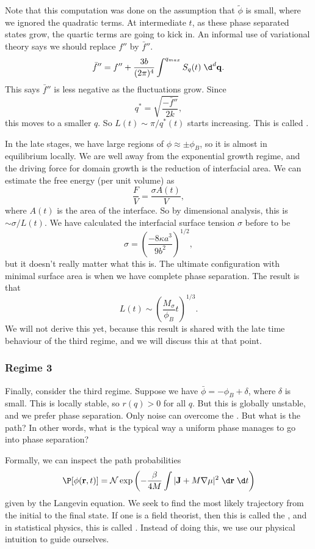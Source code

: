 \documentclass[a4paper]{article}
\begin{document}
Note that this computation was done on the assumption that $\tilde{\phi}$ is small, where we ignored the quadratic terms. At intermediate $t$, as these phase separated states grow, the quartic terms are going to kick in. An informal use of variational theory says we should replace $f''$ by $\bar{f}''$.
\[
  \bar{f}'' = f'' + \frac{3b}{(2\pi)^4} \int^{q_{max}} S_q(t) \;\d^d \mathbf{q}.
\]
This says $\bar{f}''$ is less negative as the fluctuations grow. Since
\[
  q^* = \sqrt{\frac{-\bar{f}''}{2k}},
\]
this moves to a smaller $q$. So $L(t) \sim \pi/q^*(t)$ starts increasing. This is called .

In the late stages, we have large regions of $\phi \approx \pm \phi_B$, so it is almost in equilibrium locally. We are well away from the exponential growth regime, and the driving force for domain growth is the reduction of interfacial area. We can estimate the free energy (per unit volume) as
\[
  \frac{F}{V} = \frac{\sigma A(t)}{V},
\]
where $A(t)$ is the area of the interface. So by dimensional analysis, this is $\sim \sigma/L(t)$. We have calculated the interfacial surface tension $\sigma$ before to be
\[
  \sigma = \left(\frac{-8\kappa a^3}{9b^2}\right)^{1/2},
\]
but it doesn't really matter what this is. The ultimate configuration with minimal surface area is when we have complete phase separation. The result is that
\[
  L(t) \sim \left(\frac{M_\sigma}{\phi_B} t\right)^{1/3}.
\]
We will not derive this yet, because this result is shared with the late time behaviour of the third regime, and we will discuss this at that point.

\subsubsection*{Regime 3}
Finally, consider the third regime. Suppose we have $\bar{\phi} = -\phi_B + \delta$, where $\delta$ is small. This is locally stable, so $r(q) > 0$ for all $q$. But this is globally unstable, and we prefer phase separation. Only noise can overcome the . But what is the path? In other words, what is the typical way a uniform phase manages to go into phase separation?

Formally, we can inspect the path probabilities
\[
  \P[\phi(\mathbf{r}, t)] = \mathcal{N} \exp \left(-\frac{\beta}{4M} \int |\mathbf{J} + M \nabla \mu|^2 \;\d \mathbf{r} \;\d t\right)
\]
given by the Langevin equation. We seek to find the most likely trajectory from the initial to the final state. If one is a field theorist, then this is called the , and in statistical physics, this is called . Instead of doing this, we use our physical intuition to guide ourselves.
\end{document}
